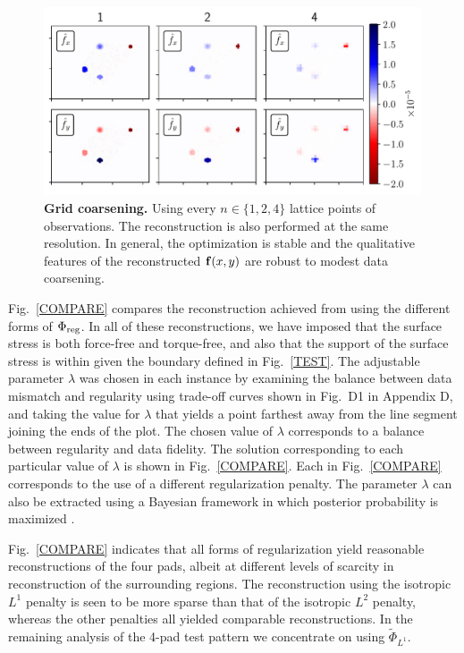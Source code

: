 \documentclass[aps,prl,reprint,groupedaddress,twocolumn]{revtex4-1}
\def\f{{\bf f}}
\newcommand{\remove}{\deleted}
\newcommand{\add}{\added}
\begin{document}
\begin{figure}
\includegraphics[width=4.4in]{fig4_landscape}
\caption{\textbf{Grid coarsening.} Using every $n\in\{1,2,4\}$ lattice
  points of observations. The reconstruction is also performed at the
  same resolution.  In general, the optimization is stable and the
  qualitative features of the reconstructed $\f(x,y)$ are robust to
  modest data coarsening.}
\label{GRID}
\end{figure}
%
%

Fig.~\ref{COMPARE} compares the reconstruction achieved from using
the different forms of $\Phi_{\rm reg}$. In all of these
reconstructions, we have imposed that the surface stress is both
force-free and torque-free, and also that the support of the surface
stress is within given the boundary defined in Fig.~\ref{TEST}.  The
adjustable parameter $\lambda$ was chosen in each instance by
examining the balance between data mismatch and regularity using
trade-off curves shown in Fig.~D1 in Appendix D, and taking
the value for $\lambda$ that yields a point farthest away from the
line segment joining the ends of the plot. The chosen value of
$\lambda$ corresponds to a balance between regularity and data
fidelity. The solution corresponding to each particular value of
$\lambda$ is shown in Fig.~\ref{COMPARE}.  Each \remove{row}\add{column} in
Fig.~\ref{COMPARE} corresponds to the use of a different
regularization penalty. The parameter $\lambda$ can also be extracted
using a Bayesian framework in which posterior probability is maximized
\cite{WATERMAN}.

Fig.~\ref{COMPARE} indicates that all forms of regularization yield
reasonable reconstructions of the four pads, albeit at different
levels of scarcity in reconstruction of the surrounding regions. The
reconstruction using the isotropic $L^1$ penalty is seen to be more
sparse than that of the isotropic $L^2$ penalty, whereas the other
penalties all yielded comparable reconstructions. In the remaining
analysis of the 4-pad test pattern we concentrate on using
$\tilde{\Phi}_{L^{1}}$.
\end{document}
